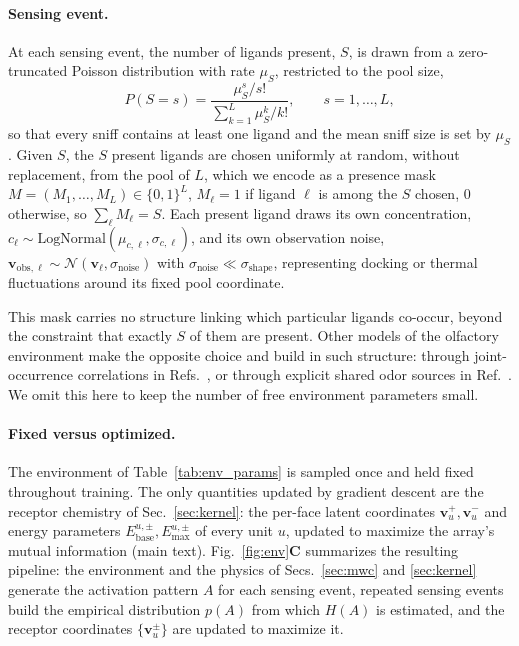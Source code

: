 \documentclass[aps,pre,superscriptaddress,floatfix,longbibliography]{revtex4-2}
\begin{document}
\paragraph{Sensing event.} At each sensing event, the number of ligands
present, $S$, is drawn from a zero-truncated Poisson distribution with rate
$\mu_S$, restricted to the pool size,
\begin{equation}
P(S=s) = \frac{\mu_S^s/s!}{\sum_{k=1}^{L}\mu_S^k/k!}, \qquad s=1,\dots,L,
\label{eq:ztp}
\end{equation}
so that every sniff contains at least one ligand and the mean sniff size is
set by $\mu_S$. Given $S$, the $S$ present ligands are chosen uniformly at
random, without replacement, from the pool of $L$, which we encode as a
presence mask $M=(M_1,\dots,M_L)\in\{0,1\}^L$, $M_\ell=1$ if ligand $\ell$ is
among the $S$ chosen, $0$ otherwise, so $\sum_\ell M_\ell = S$. Each present
ligand draws its own concentration, $c_\ell\sim\text{LogNormal}(\mu_{c,\ell},\sigma_{c,\ell})$,
and its own observation noise, $\mathbf v_{\text{obs},\ell}\sim\mathcal
N(\mathbf v_\ell,\sigma_\text{noise})$ with $\sigma_\text{noise}\ll\sigma_\text{shape}$,
representing docking or thermal fluctuations around its fixed pool
coordinate.

This mask carries no structure linking which particular ligands co-occur,
beyond the constraint that exactly $S$ of them are present. Other models of
the olfactory environment make the opposite choice and build in such
structure: through joint-occurrence correlations in
Refs.~\cite{zwicker_receptor_2016,tesileanu_adaptation_2019}, or through
explicit shared odor sources in Ref.~\cite{del_castillo_convergent_2026}. We
omit this here to keep the number of free environment parameters small.

\paragraph{Fixed versus optimized.} The environment of
Table~\ref{tab:env_params} is sampled once and held fixed throughout
training. The only quantities updated by gradient descent are the receptor
chemistry of Sec.~\ref{sec:kernel}: the per-face latent coordinates
$\mathbf v_u^{+},\mathbf v_u^{-}$ and energy parameters
$E_\text{base}^{u,\pm},E_\text{max}^{u,\pm}$ of every unit $u$, updated to
maximize the array's mutual information (main text). Fig.~\ref{fig:env}\textbf{C}
summarizes the resulting pipeline: the environment and the physics of
Secs.~\ref{sec:mwc} and \ref{sec:kernel} generate the activation pattern $A$ for
each sensing event, repeated sensing events build the empirical distribution
$p(A)$ from which $H(A)$ is estimated, and the receptor coordinates
$\{\mathbf v_u^{\pm}\}$ are updated to maximize it.
\end{document}
